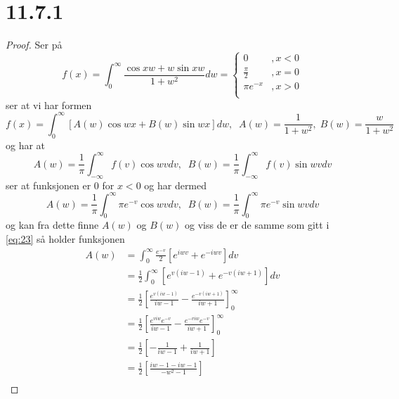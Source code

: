 \documentclass{report}
\newcommand{\bbrack}[1]{\left[ #1 \right]}
\begin{document}
\section*{11.7.1}
\begin{proof}
  Ser på
  \begin{equation}
    \label{eq:3}
    f(x) = \int_{0}^{\infty} \frac{\cos xw + w \sin xw}{1 + w^{2}}dw = \left\lbrace
    \begin{array}{ll}
      0 & , x < 0 \\
      \frac{\pi}{2} & , x = 0 \\
      \pi e^{-x} & , x > 0 \\
    \end{array} \right.
  \end{equation}
  ser at vi har formen
  \begin{equation}
    \label{eq:23}
    f(x) = \int_{0}^{\infty} \bbrack{ A(w)\cos wx + B(w) \sin wx } dw, \;\; A(w) = \frac{1}{1+w^{2}}, \; B(w) = \frac{w}{1+w^{2}}
  \end{equation}
  og har at
  \begin{equation}
    \label{eq:24}
    A(w) = \frac{1}{\pi} \int_{-\infty}^{\infty} f(v) \cos wv dv, \;\; B(w) = \frac{1}{\pi} \int_{-\infty}^{\infty} f(v) \sin wv dv
  \end{equation}
  ser at funksjonen er 0 for $x < 0$ og har dermed
  \begin{equation}
    \label{eq:25}
    A(w) = \frac{1}{\pi} \int_{0}^{\infty} \pi e^{-v} \cos wv dv, \;\; B(w) = \frac{1}{\pi} \int_{0}^{\infty} \pi e^{-v} \sin wv dv
  \end{equation}
  og kan fra dette finne $A(w)$ og $B(w)$ og viss de er de samme som gitt i \eqref{eq:23} så holder funksjonen
  \begin{equation}
    \label{eq:1}
    \begin{split}
      A(w) &= \int_{0}^{\infty} \frac{e^{-v}}{2} \bbrack{ e^{iwv} + e^{-iwv} } dv \\
          &= \frac{1}{2} \int_{0}^{\infty} \bbrack{ e^{v(iw-1)} + e^{-v(iw+1)} } dv \\
          &= \frac{1}{2} \bbrack{ \frac{e^{v(iw-1)}}{iw-1} - \frac{e^{-v(iw+1)}}{iw+1} }_{0}^{\infty} \\
          &= \frac{1}{2} \bbrack{ \frac{e^{viw}e^{-v}}{iw-1} - \frac{e^{-viw}e^{-v}}{iw+1} }_{0}^{\infty} \\
          &= \frac{1}{2} \bbrack{ -\frac{1}{iw - 1} + \frac{1}{iw+1} } \\
          &= \frac{1}{2} \bbrack{ \frac{iw-1 - iw-1}{-w^{2}-1} } \\

\end{split}
\end{equation}
\end{proof}
\end{document}

